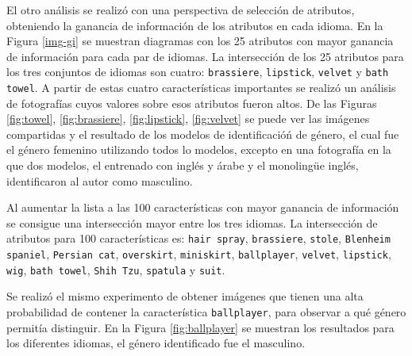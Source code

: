 \documentclass[runningheads]{llncs}
\begin{document}
El otro análisis se realizó con una perspectiva 
de selección de atributos, obteniendo la ganancia de información 
de los atributos en cada idioma. En la Figura \ref{img-gi} se muestran
diagramas con los 25 atributos con mayor ganancia de información para cada par de 
idiomas. La intersección de los 25 atributos para los tres conjuntos de idiomas 
son cuatro: \texttt{brassiere}, \texttt{lipstick}, \texttt{velvet} y 
\texttt{bath towel}. A partir de estas cuatro características importantes
se realizó un análisis de fotografías cuyos valores sobre esos atributos
fueron altos. De las Figuras \ref{fig:towel}, \ref{fig:brassiere}, 
\ref{fig:lipstick}, \ref{fig:velvet} se puede ver las imágenes compartidas
y el resultado de los modelos de identificacióń de género, el cual fue el género
femenino utilizando todos lo modelos, excepto en una fotografía en la que dos modelos,
el entrenado con inglés y árabe y el monolingüe inglés, identificaron al autor
como masculino.

Al aumentar la lista a las 100 características con mayor ganancia de información
se consigue una intersección mayor entre los tres idiomas. La intersección
de atributos para 100 características es: \texttt{hair spray}, \texttt{brassiere}, \texttt{stole}, \texttt{Blenheim spaniel}, \texttt{Persian cat}, \texttt{overskirt}, \texttt{miniskirt}, \texttt{ballplayer}, \texttt{velvet}, \texttt{lipstick}, \texttt{wig}, \texttt{bath towel}, \texttt{Shih Tzu}, \texttt{spatula} y \texttt{suit}.

Se realizó el mismo experimento de obtener imágenes que tienen una alta 
probabilidad de contener la característica \texttt{ballplayer}, para
observar a qué género permitía distinguir. En la Figura \ref{fig:ballplayer}
se muestran los resultados para los diferentes idiomas, el género identificado
fue el masculino.
\end{document}
